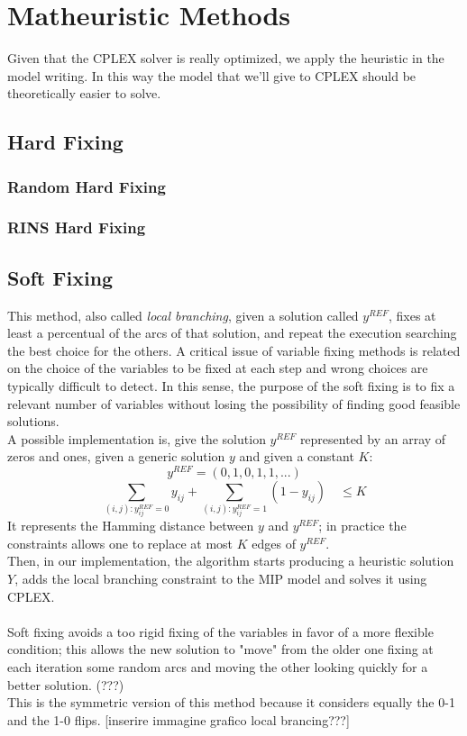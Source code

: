 
\chapter{Matheuristic Methods}
\label{chp:4-Matheuristics}
Given that the \textsc{CPLEX} solver is really optimized, we apply the heuristic in the model writing. In this way the model that we’ll give to \textsc{CPLEX} should be theoretically easier to solve.

\section{Hard Fixing}

\subsection{Random Hard Fixing}

\subsection{RINS Hard Fixing}



\section{Soft Fixing}
This method, also called \textit{local branching}, given a solution called $y^{REF}$, fixes at least a percentual of the arcs of that solution, and repeat the execution searching the best choice for the others. A critical issue of variable fixing methods is related on the choice of the variables to be fixed at each step and wrong choices are typically difficult to detect. In this sense, the purpose of the soft fixing is to fix a relevant number of variables without losing the possibility of finding good feasible solutions.\\
A possible implementation is, give the solution $y^{REF}$ represented by an array of zeros and ones, given a generic solution $y$ and given a constant $K$:
\[
	y^{REF} = (0,1,0,1,1,...)
\]
\[
	\sum_{(i,j):y^{REF}_{ij}=0} y_{ij} + \sum_{(i,j):y^{REF}_{ij}=1} (1-y_{ij}) \quad \leq K
\]
It represents the Hamming distance between $y$ and $y^{REF}$; in practice the constraints allows one to replace at most $K$ edges of $y^{REF}$. \\
Then, in our implementation, the algorithm starts producing a heuristic solution $Y$, adds the local branching constraint to the MIP model and solves it using \textsc{CPLEX}.\\
[come abbiamo scelto K ???]\\
Soft fixing avoids a too rigid fixing of the variables in favor of a more flexible condition; this allows the new solution to "move" from the older one fixing at each iteration some random arcs and moving the other looking quickly for a better solution. (???) \\
This is the symmetric version of this method because it considers equally the 0-1 and the 1-0 flips. 
[inserire immagine grafico local brancing???]

